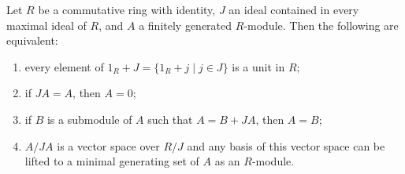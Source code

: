Let $R$ be a commutative ring with identity, $J$ an ideal contained in every maximal ideal of $R$, and $A$ a finitely generated $R$-module. Then the following are equivalent:
\begin{enumerate}
  \item every element of $1_R + J = \{1_R + j \mid j \in J\}$ is a unit in $R$;
  \item if $JA = A$, then $A = 0$;
  \item if $B$ is a submodule of $A$ such that $A = B + JA$, then $A = B$;
  \item $A/JA$ is a vector space over $R/J$ and any basis of this vector space can be lifted to a minimal generating set of $A$ as an $R$-module.
\end{enumerate}
